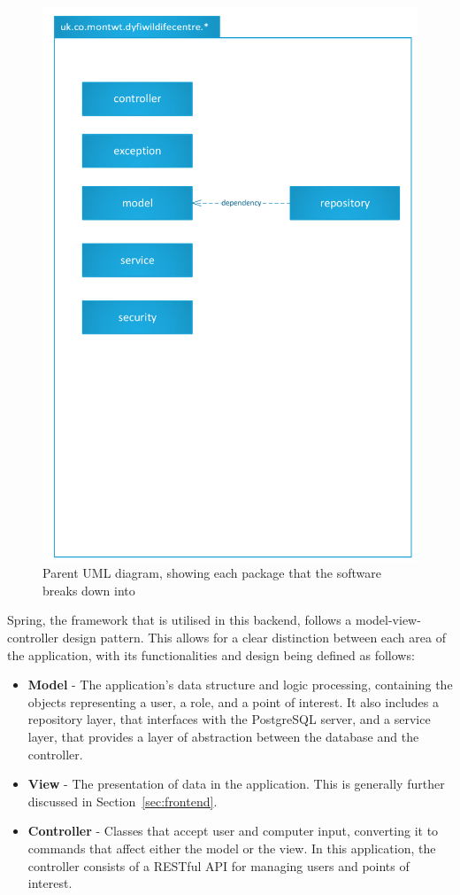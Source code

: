 \begin{figure}[H]
	\includegraphics[scale=0.7]{diagrams/parent_uml}
	\caption{Parent UML diagram, showing each package that the software breaks down into}
\end{figure}	

Spring, the framework that is utilised in this backend, follows a model-view-controller design pattern. This allows for a clear distinction between each area of the application, with its functionalities and design being defined as follows:

\begin{itemize}
	\item	\textbf{Model} - The application's data structure and logic processing, containing the objects representing a user, a role, and a point of interest. It also includes a repository layer, that interfaces with the PostgreSQL server, and a service layer, that provides a layer of abstraction between the database and the controller.
	\item	\textbf{View} - The presentation of data in the application. This is generally further discussed in Section~\ref{sec:frontend}.
	\item	\textbf{Controller} - Classes that accept user and computer input, converting it to commands that affect either the model or the view. In this application, the controller consists of a RESTful API for managing users and points of interest.
\end{itemize}

